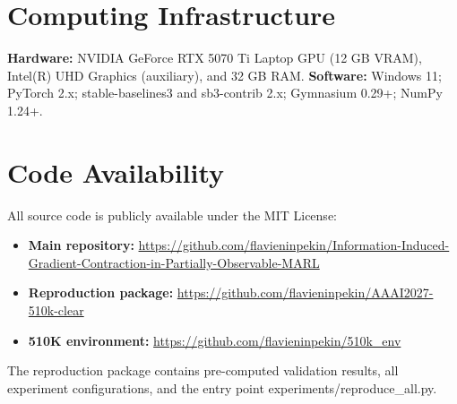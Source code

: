 \documentclass[letterpaper]{article}
\begin{document}
\section{Computing Infrastructure}

\noindent\textbf{Hardware:} NVIDIA GeForce RTX 5070 Ti Laptop GPU
(12 GB VRAM), Intel(R) UHD Graphics (auxiliary), and 32 GB RAM.
\textbf{Software:} Windows 11; PyTorch 2.x; stable-baselines3 and
sb3-contrib 2.x; Gymnasium 0.29+; NumPy 1.24+.

\section{Code Availability}

\small
All source code is publicly available under the MIT License:

\begin{itemize}
\item \textbf{Main repository:}
  \url{https://github.com/flavieninpekin/Information-Induced-Gradient-Contraction-in-Partially-Observable-MARL}
\item \textbf{Reproduction package:}
  \url{https://github.com/flavieninpekin/AAAI2027-510k-clear}
\item \textbf{510K environment:}
  \url{https://github.com/flavieninpekin/510k_env}
\end{itemize}

The reproduction package contains pre-computed validation results, all
experiment configurations, and the entry point experiments/reproduce\_all.py.
\end{document}
